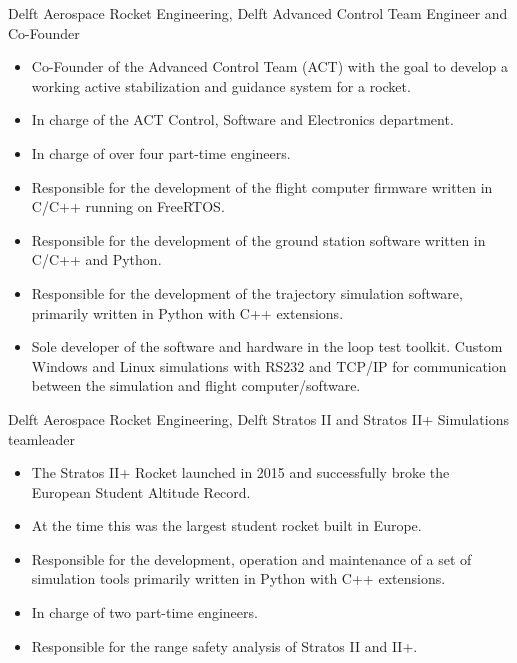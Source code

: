 \documentclass{tccv}
\begin{document}
\begin{eventlist}
     {Delft Aerospace Rocket Engineering, Delft}
     {Advanced Control Team Engineer and Co-Founder}
\begin{itemize}
    \item {Co-Founder of the Advanced Control Team (ACT) with the goal to develop a working active stabilization and guidance system for a rocket.}
    \item {In charge of the ACT Control, Software and Electronics department.}
    \item {In charge of over four part-time engineers.}
    \item {Responsible for the development of the flight computer firmware written in C/C++ running on FreeRTOS.}
    \item {Responsible for the development of the ground station software written in C/C++ and Python.}
    \item {Responsible for the development of the trajectory simulation software, primarily written in Python with C++ extensions.}
    \item {Sole developer of the software and hardware in the loop test toolkit. Custom Windows and Linux simulations with RS232 and TCP/IP for communication between the simulation and flight computer/software.}
\end{itemize}



     {Delft Aerospace Rocket Engineering, Delft}
     {Stratos II and Stratos II+ Simulations teamleader}
\begin{itemize}
    \item {The Stratos II+ Rocket launched in 2015 and successfully broke the European Student Altitude Record.}
    \item {At the time this was the largest student rocket built in Europe.}
    \item {Responsible for the development, operation and maintenance of a set of simulation tools primarily written in Python with C++ extensions.}
    \item{In charge of two part-time engineers.}
    \item{Responsible for the range safety analysis of Stratos II and II+.}
\end{itemize}


\end{eventlist}
\end{document}
